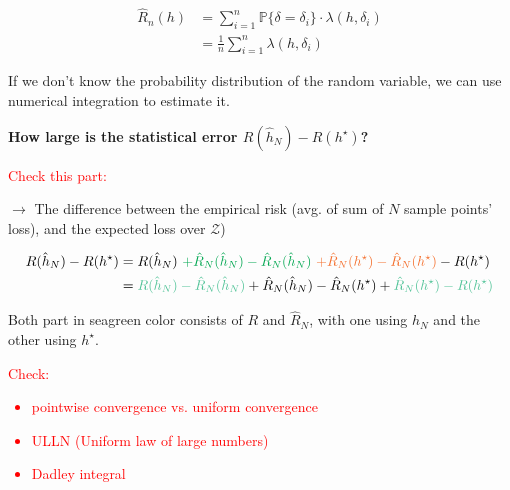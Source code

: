 \documentclass{article}
\begin{document}
\begin{align*}
    \hat{R}_n(h) 
    &= \sum_{i=1}^n \mathbb{P}\{\delta = \delta_i\} \cdot \lambda(h, \delta_i) \\
    &= \frac{1}{n} \sum_{i=1}^n \lambda(h, \delta_i)
\end{align*}

If we don't know the probability distribution of the random variable,
we can use numerical integration to estimate it.
\bigskip

\begin{center}
    \textbf{How large is the statistical error $R(\hat{h}_N) - R(h^\star)$?}   
\end{center}

\textcolor{Red}{Check this part:}  

$\rightarrow$ The difference between the empirical risk (avg. of sum of $N$ sample points' loss), and the expected loss over $\mathcal{Z}$)

\begin{align*}
    R(\hat{h}_N) - R(h^\star) 
    &= R(\hat{h}_N) \ \textcolor{Green}{ + \hat{R}_N(\hat{h}_N) -\hat{R}_N(\hat{h}_N)} \ \textcolor{Orange}{ + \hat{R}_N(h^\star) -\hat{R}_N(h^\star)} - R(h^\star) \\
    &= \textcolor{SeaGreen}{R(\hat{h}_N) - \hat{R}_N(\hat{h}_N)} + \hat{R}_N(\hat{h}_N) -\hat{R}_N(h^\star) + \textcolor{SeaGreen}{\hat{R}_N(h^\star) - R(h^\star)}
\end{align*}

Both part in seagreen color consists of $R$ and $\hat{R}_N$, with one using $\hat{h}_N$ and the other using $h^\star$.

\textcolor{Red}
{Check:
    \begin{itemize}
        \item pointwise convergence vs. uniform convergence
        \item ULLN (Uniform law of large numbers)
        \item Dadley integral
    \end{itemize}
}
\end{document}
